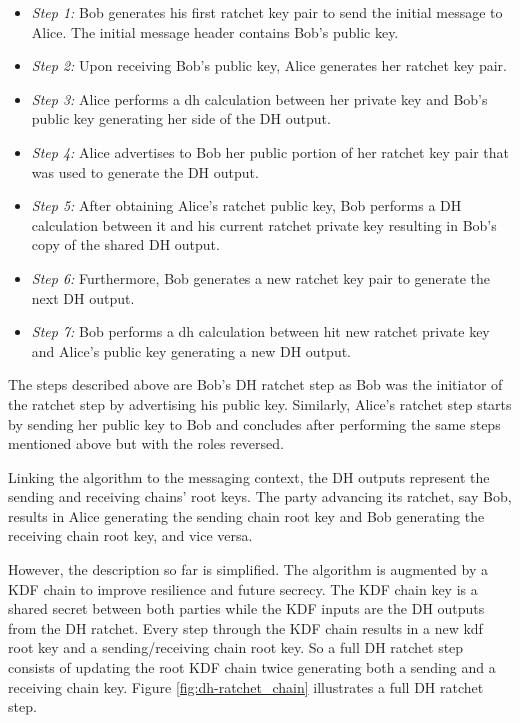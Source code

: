 \begin{itemize}
	\item \textit{Step 1:} Bob generates his first ratchet key pair to send the initial message to Alice. The initial message header contains Bob's public key. 
	
	\item \textit{Step 2:} Upon receiving Bob's public key, Alice generates her ratchet key pair.
	
	\item \textit{Step 3:} Alice performs a \gls{dh} calculation between her private key and Bob's public key generating her side of the DH output.
	
	\item \textit{Step 4:} Alice advertises to Bob her public portion of her ratchet key pair that was used to generate the DH output.
	
	\item \textit{Step 5:} After obtaining Alice's ratchet public key, Bob performs a DH calculation between it and his current ratchet private key resulting in Bob's copy of the shared DH output.
	
	\item \textit{Step 6:} Furthermore, Bob generates a new ratchet key pair to generate the next DH output.
	
	\item \textit{Step 7:} Bob performs a \gls{dh} calculation between hit new ratchet private key and Alice's public key generating a new DH output.
\end{itemize}
The steps described above are Bob's DH ratchet step as Bob was the initiator of the ratchet step by advertising his public key. Similarly, Alice's ratchet step starts by sending her public key to Bob and concludes after performing the same steps mentioned above but with the roles reversed.
\par
Linking the algorithm to the messaging context, the DH outputs represent the sending and receiving chains' root keys. The party advancing its ratchet, say Bob, results in Alice generating the sending chain root key and Bob generating the receiving chain root key, and vice versa.
\par
However, the description so far is simplified. The algorithm is augmented by a KDF chain to improve resilience and future secrecy. The KDF chain key is a shared secret between both parties while the KDF inputs are the DH outputs from the DH ratchet. Every step through the KDF chain results in a new kdf root key and a sending/receiving chain root key. So a full DH ratchet step consists of updating the root KDF chain twice generating both a sending and a receiving chain key. Figure \ref{fig:dh-ratchet_chain} illustrates a full DH ratchet step.

